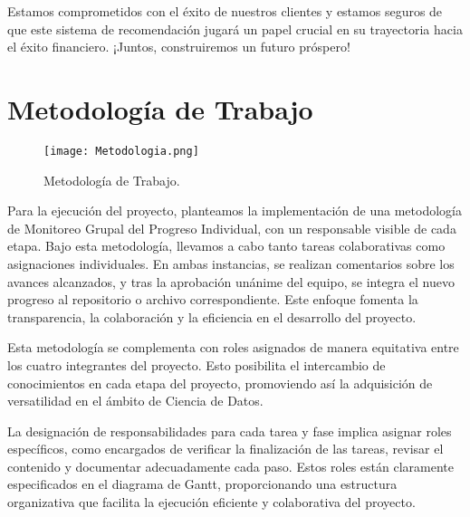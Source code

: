\documentclass[12pt]{article}
\begin{document}
 Estamos comprometidos con el éxito de nuestros clientes y estamos seguros de que este sistema de recomendación jugará un papel crucial en su trayectoria hacia el éxito financiero. ¡Juntos, construiremos un futuro próspero!


\section{Metodología de Trabajo}

\begin{figure}[H]
  \centering
  \texttt{[image: Metodologia.png]}
  \caption{Metodología de Trabajo.}
  \label{fig:Metodología}
\end{figure}

Para la ejecución del proyecto, planteamos la implementación de una metodología de Monitoreo Grupal del Progreso Individual, con un responsable visible de cada etapa. Bajo esta metodología, llevamos a cabo tanto tareas colaborativas como asignaciones individuales. En ambas instancias, se realizan comentarios sobre los avances alcanzados, y tras la aprobación unánime del equipo, se integra el nuevo progreso al repositorio o archivo correspondiente. Este enfoque fomenta la transparencia, la colaboración y la eficiencia en el desarrollo del proyecto.

Esta metodología se complementa con roles asignados de manera equitativa entre los cuatro integrantes del proyecto. Esto posibilita el intercambio de conocimientos en cada etapa del proyecto, promoviendo así la adquisición de versatilidad en el ámbito de Ciencia de Datos.

La designación de responsabilidades para cada tarea y fase implica asignar roles específicos, como encargados de verificar la finalización de las tareas, revisar el contenido y documentar adecuadamente cada paso. Estos roles están claramente especificados en el diagrama de Gantt, proporcionando una estructura organizativa que facilita la ejecución eficiente y colaborativa del proyecto.
\end{document}
